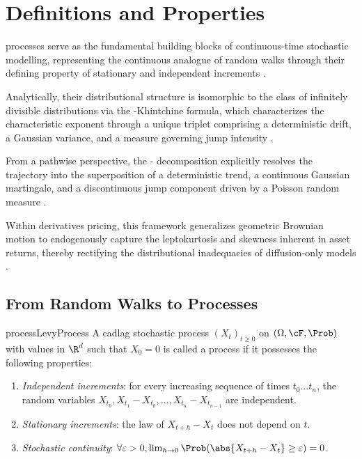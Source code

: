 \section{Definitions and Properties}

\Levy{} processes serve as the fundamental building blocks of continuous-time stochastic modelling, representing the continuous analogue of random walks through their defining property of stationary and independent increments \parencite{sato_levy_2013, schilling_introduction_2016}.

Analytically, their distributional structure is isomorphic to the class of infinitely divisible distributions via the \Levy{}-Khintchine formula, which characterizes the characteristic exponent through a unique triplet comprising a deterministic drift, a Gaussian variance, and a \Levy{} measure governing jump intensity \parencite{applebaum_levy_2013}.

From a pathwise perspective, the \Levy{}-\Ito{} decomposition explicitly resolves the trajectory into the superposition of a deterministic trend, a continuous Gaussian martingale, and a discontinuous jump component driven by a Poisson random measure \parencite{kyprianou_fluctuations_2014}.

Within derivatives pricing, this framework generalizes geometric Brownian motion to endogenously capture the leptokurtosis and skewness inherent in asset returns, thereby rectifying the distributional inadequacies of diffusion-only models \parencite{cont_financial_2004}.

\subsection{From Random Walks to \Levy{} Processes}

\begin{defn}{\Levy{} process}{LevyProcess}
	A cadlag\footnotemark{} stochastic process \((X_t)_{t \ge 0}\) on \((\Omega, \cF, \Prob)\) with values in \(\R^d\) such that \(X_0 = 0\) is called a \Levy{} process if it possesses the following properties:
	\begin{enumerate}[label=\arabic*.]
		\item \emph{Independent increments}: for every increasing sequence of times \(t_0 \dots t_n\), the random variables \(X_{t_0}, X_{t_1} - X_{t_0}, \dots, X_{t_n} - X_{t_{n-1}}\) are independent.
		\item \emph{Stationary increments}: the law of \(X_{t+h} - X_t\) does not depend on \(t\).
		\item \emph{Stochastic continuity}: \(\forall \varepsilon > 0, \lim_{h \to 0} \Prob(\abs{X_{t+h} - X_t} \ge \varepsilon) = 0\).
	\end{enumerate}
\end{defn}

